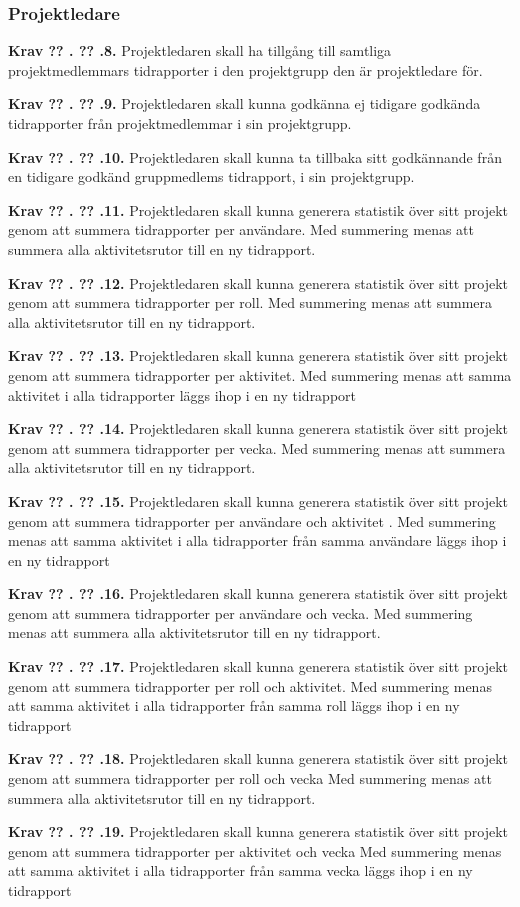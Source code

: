 \documentclass[a4paper]{article}
\newcommand\getcurrentref[1]{%
 \ifnumequal{\value{#1}}{0}
  {??}
  {\the\value{#1}}%
}
\newcommand\requirement[2]{
	\numberedrow{Krav}{#1}{#2}
}
\newcommand\numberedrow[3]{
	\noindent
	\textbf{#1 \getcurrentref{section}.\getcurrentref{subsection}.#2.} #3
	
}
\begin{document}
		\subsubsection*{Projektledare}
			\requirement{8}{Projektledaren skall ha tillgång till samtliga projektmedlemmars tidrapporter i den projektgrupp den är projektledare för.}
			\requirement{9}{Projektledaren skall kunna godkänna ej tidigare godkända tidrapporter från projektmedlemmar i sin projektgrupp.}
			\requirement{10}{Projektledaren skall kunna ta tillbaka sitt godkännande från en tidigare godkänd gruppmedlems tidrapport, i sin projektgrupp.}
			\requirement{11}{Projektledaren skall kunna generera statistik över sitt projekt genom att summera tidrapporter per användare. Med summering menas att summera alla aktivitetsrutor till en ny tidrapport.}
			\requirement{12}{Projektledaren skall kunna generera statistik över sitt projekt genom att summera tidrapporter per roll. Med summering menas att summera alla aktivitetsrutor till en ny tidrapport.}
			\requirement{13}{Projektledaren skall kunna generera statistik över sitt projekt genom att summera tidrapporter per aktivitet. Med summering menas att samma aktivitet i alla tidrapporter läggs ihop i en ny tidrapport}
			\requirement{14}{Projektledaren skall kunna generera statistik över sitt projekt genom att summera tidrapporter per vecka. Med summering menas att summera alla aktivitetsrutor till en ny tidrapport.}
			\requirement{15}{Projektledaren skall kunna generera statistik över sitt projekt genom att summera tidrapporter per användare och aktivitet . Med summering menas att samma aktivitet i alla tidrapporter från samma användare läggs ihop i en ny tidrapport}
			\requirement{16}{Projektledaren skall kunna generera statistik över sitt projekt genom att summera tidrapporter per användare och vecka. Med summering menas att summera alla aktivitetsrutor till en ny tidrapport.}
			\requirement{17}{Projektledaren skall kunna generera statistik över sitt projekt genom att summera tidrapporter per roll och aktivitet. Med summering menas att samma aktivitet i alla tidrapporter från samma roll läggs ihop i en ny tidrapport}
			\requirement{18}{Projektledaren skall kunna generera statistik över sitt projekt genom att summera tidrapporter per roll och vecka Med summering menas att summera alla aktivitetsrutor till en ny tidrapport.}
			\requirement{19}{Projektledaren skall kunna generera statistik över sitt projekt genom att summera tidrapporter per aktivitet och vecka Med summering menas att samma aktivitet i alla tidrapporter från samma vecka läggs ihop i en ny tidrapport}
\end{document}

